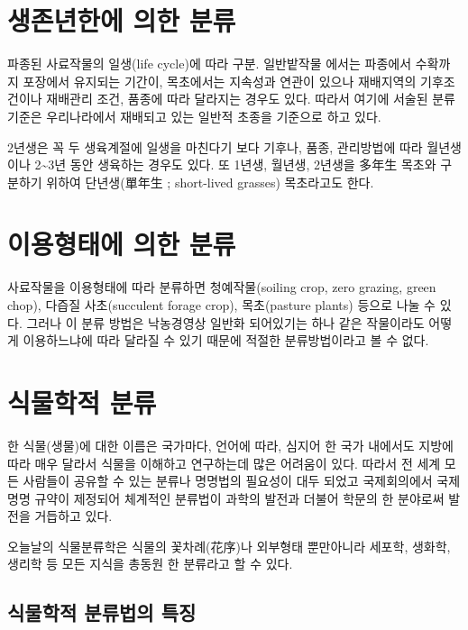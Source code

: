 \documentclass[]{book}
\begin{document}
\section{생존년한에 의한 분류}\label{--}

파종된 사료작물의 일생(life cycle)에 따라 구분. 일반밭작물 에서는
파종에서 수확까지 포장에서 유지되는 기간이, 목초에서는 지속성과 연관이
있으나 재배지역의 기후조건이나 재배관리 조건, 품종에 따라 달라지는
경우도 있다. 따라서 여기에 서술된 분류기준은 우리나라에서 재배되고 있는
일반적 초종을 기준으로 하고 있다.

2년생은 꼭 두 생육계절에 일생을 마친다기 보다 기후나, 품종, 관리방법에
따라 월년생이나 2\textasciitilde{}3년 동안 생육하는 경우도 있다. 또
1년생, 월년생, 2년생을 多年生 목초와 구분하기 위하여 단년생(單年生 ;
short-lived grasses) 목초라고도 한다.

\section{이용형태에 의한 분류}\label{--}

사료작물을 이용형태에 따라 분류하면 청예작물(soiling crop, zero grazing,
green chop), 다즙질 사초(succulent forage crop), 목초(pasture plants)
등으로 나눌 수 있다. 그러나 이 분류 방법은 낙농경영상 일반화 되어있기는
하나 같은 작물이라도 어떻게 이용하느냐에 따라 달라질 수 있기 때문에
적절한 분류방법이라고 볼 수 없다.

\section{식물학적 분류}\label{-}

한 식물(생물)에 대한 이름은 국가마다, 언어에 따라, 심지어 한 국가
내에서도 지방에 따라 매우 달라서 식물을 이해하고 연구하는데 많은
어려움이 있다. 따라서 전 세계 모든 사람들이 공유할 수 있는 분류나
명명법의 필요성이 대두 되었고 국제회의에서 국제 명명 규약이 제정되어
체계적인 분류법이 과학의 발전과 더불어 학문의 한 분야로써 발전을
거듭하고 있다.

오늘날의 식물분류학은 식물의 꽃차례(花序)나 외부형태 뿐만아니라 세포학,
생화학, 생리학 등 모든 지식을 총동원 한 분류라고 할 수 있다.

\subsection{식물학적 분류법의 특징}\label{--}
\end{document}
